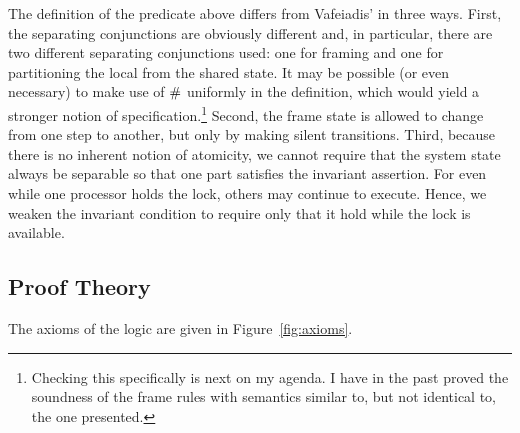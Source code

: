 \documentclass[11pt]{report}
\begin{document}
The definition of the predicate above differs from Vafeiadis' in three ways. First, the separating conjunctions are obviously different and, in particular, there are two different separating conjunctions used: one for framing and one for partitioning the local from the shared state. It may be possible (or even necessary) to make use of $\operatorname{\#}$ uniformly in the definition, which would yield a stronger notion of specification.\footnote{Checking this specifically is next on my agenda. I have in the past proved the soundness of the frame rules with semantics similar to, but not identical to, the one presented.} Second, the frame state is allowed to change from one step to another, but only by making silent transitions. Third, because there is no inherent notion of atomicity, we cannot require that the system state always be separable so that one part satisfies the invariant assertion. For even while one processor holds the lock, others may continue to execute. Hence, we weaken the invariant condition to require only that it hold while the lock is available.

\subsection{Proof Theory}

The axioms of the logic are given in Figure~\ref{fig:axioms}.
\end{document}
